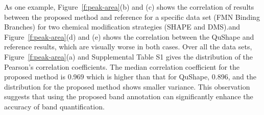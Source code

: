 As one example, Figure~\ref{f:peak-area}(b) and (c) shows the correlation of results between the proposed method and reference for a specific data set (FMN Binding Branches) for two chemical modification strategies (SHAPE and DMS).and Figure~\ref{f:peak-area}(d) and (e) shows the correlation between the QuShape and reference results, which are visually worse in both cases. Over all the data sets, Figure~\ref{f:peak-area}(a) and Supplemental Table S1 gives the distribution of the Pearson's correlation coefficients. The median correlation coefficient for the proposed method is 0.969 which is higher than that for QuShape, 0.896, and the distribution for the proposed method shows smaller variance. This observation suggests that using the proposed band annotation can significantly enhance the accuracy of band quantification. 


